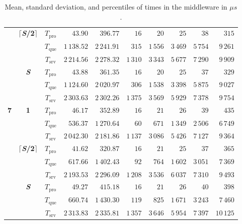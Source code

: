 \documentclass[11pt]{article}
\theoremstyle{definition}
\newcommand\Tque{T_{\mathrm{que}}}
\newcommand\Tsrv{T_{\mathrm{srv}}}
\newcommand\Tpro{T_{\mathrm{pro}}}
\renewcommand\b[1]{{\bf{#1}}}
\begin{document}
\begin{table}[h]
{\begin{tabular}{|c|c|c||r|r||r|r|r|r|r|}
            \cline{2-10}
            & \multirow{3}{*}{$\lceil$\b{\textit S/2}$\rceil$} & $\Tpro$ & $43.90$ & $396.77$ & $16$ & $20$ & $25$ & $38$ & $315$ \\
            & & $\Tque$ & $1\,138.52$ & $2\,241.91$ & $315$ & $1\,556$ & $3\,469$ & $5\,754$ & $9\,261$ \\
            & & $\Tsrv$ & $2\,214.56$ & $2\,278.32$ & $1\,310$ & $3\,343$ & $5\,677$ & $7\,290$ & $9\,909$ \\
            \cline{2-10}
            & \multirow{3}{*}{\b{\textit S}} & $\Tpro$ & $43.88$ & $361.35$ & $16$ & $20$ & $25$ & $37$ & $329$ \\
            & & $\Tque$ & $1\,124.60$ & $2\,020.97$ & $306$ & $1\,538$ & $3\,398$ & $5\,875$ & $9\,027$ \\
            & & $\Tsrv$ & $2\,303.63$ & $2\,302.26$ & $1\,375$ & $3\,569$ & $5\,929$ & $7\,378$ & $9\,754$ \\
            \hline
            \hline
            \multirow{9}{*}{\b7} & \multirow{3}{*}{\b1} & $\Tpro$ & $46.17$ & $352.89$ & $16$ & $21$ & $26$ & $39$ & $435$ \\
            & & $\Tque$ & $536.37$ & $1\,270.64$ & $60$ & $671$ & $1\,349$ & $2\,506$ & $6\,749$ \\
            & & $\Tsrv$ & $2\,042.30$ & $2\,181.86$ & $1\,137$ & $3\,086$ & $5\,426$ & $7\,127$ & $9\,364$ \\
            \cline{2-10}
            & \multirow{3}{*}{$\lceil$\b{\textit S/2}$\rceil$} & $\Tpro$ & $41.62$ & $320.87$ & $16$ & $21$ & $25$ & $37$ & $365$ \\
            & & $\Tque$ & $617.66$ & $1\,402.43$ & $92$ & $764$ & $1\,602$ & $3\,051$ & $7\,369$ \\
            & & $\Tsrv$ & $2\,193.53$ & $2\,296.09$ & $1\,208$ & $3\,536$ & $6\,037$ & $7\,310$ & $9\,493$ \\
            \cline{2-10}
            & \multirow{3}{*}{\b{\textit S}} & $\Tpro$ & $49.27$ & $415.18$ & $16$ & $21$ & $26$ & $40$ & $398$ \\
            & & $\Tque$ & $660.74$ & $1\,430.30$ & $119$ & $825$ & $1\,671$ & $3\,243$ & $7\,460$ \\
            & & $\Tsrv$ & $2\,313.83$ & $2\,335.81$ & $1\,357$ & $3\,646$ & $5\,954$ & $7\,397$ & $10\,125$ \\
            \hline
        \end{tabular}
    }
    \caption{Mean, standard deviation, and percentiles of times in the middleware in $\mu s$.}
    \label{tab:04-percs}
\end{table}
\end{document}
